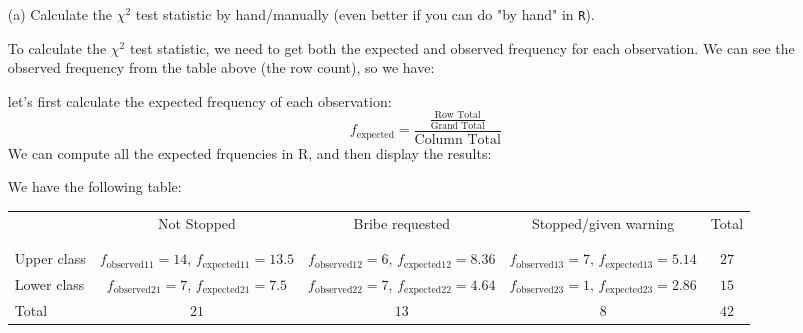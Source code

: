 \documentclass[12pt,letterpaper]{article}
\begin{document}
\begin{enumerate}
	
	\item [(a)]
	Calculate the $\chi^2$ test statistic by hand/manually (even better if you can do "by hand" in \texttt{R}).\\
	\vspace{0.2cm}
	
	To calculate the $\chi^2$ test statistic, we need to get both the expected and observed frequency for each observation. 
	We can see the observed frequency from the table above (the row count), so we have:
	
	
	
	
	let's first calculate the expected frequency of each observation:
	\[
	f_{\text{expected}} = \frac{\frac{\text{Row Total}}{\text{Grand Total}}}{\text{Column Total}}
	\]
	We can compute all the expected frquencies in R, and then display the results:
	
	 
	 We have the following table:
	 
	 
\begin{table}[h!]
	\centering
	\scriptsize %
	\begin{tabular}{l | c c c | c }
		& Not Stopped & Bribe requested & Stopped/given warning & Total \\
		\\[-1.8ex] 
		\hline \\[-1.8ex]
		Upper class & $f_{\text{observed11}}=14$, $f_{\text{expected11}}=13.5$ 
		& $f_{\text{observed12}}=6$,  $f_{\text{expected12}}=8.36$
		& $f_{\text{observed13}}=7$, $f_{\text{expected13}}=5.14$
		& $27$ \\
		
		Lower class & $f_{\text{observed21}}=7$, $f_{\text{expected21}}=7.5$ 
		& $f_{\text{observed22}}=7$, $f_{\text{expected22}}=4.64$
		& $f_{\text{observed23}}=1$, $f_{\text{expected23}}=2.86$
		& $15$ \\
		\hline
		Total & $21$ & $13$ & $8$ & $42$ \\
	\end{tabular}
\end{table}


\newpage
	 

\end{enumerate}
\end{document}
